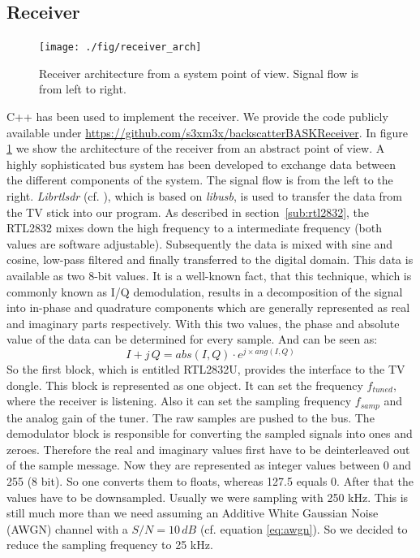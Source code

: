 \documentclass[conference]{IEEEtran}
\begin{document}
\subsection{Receiver}
\begin{figure}[h]
\centering
\texttt{[image: ./fig/receiver\_arch]}
\caption{Receiver architecture from a system point of view. Signal flow is from left to right.}
\label{fig:receiver_arch}
\end{figure}
C++ has been used to implement the receiver. We provide the code publicly available under \url{https://github.com/s3xm3x/backscatterBASKReceiver}. In figure \ref{fig:receiver_arch} we show the architecture of the receiver from an abstract point of view. A highly sophisticated bus system has been developed to exchange data between the different components of the system. The signal flow is from the left to the right. \textit{Librtlsdr} (cf. \cite{steve-m_librtlsdr}), which is based on \textit{libusb}, is used to transfer the data from the TV stick into our program. As described in section~\ref{sub:rtl2832}, the RTL2832 mixes down the high frequency to a intermediate frequency (both values are software adjustable). Subsequently the data is mixed with sine and cosine, low-pass filtered and finally transferred to the digital domain. This data is available as two 8-bit values. It is a well-known fact, that this technique, which is commonly known as I/Q demodulation, results in a decomposition of the signal into in-phase and quadrature components which are generally represented as real and imaginary parts respectively. With this two values, the phase and absolute value of the data can be determined for every sample. And can be seen as:
\begin{equation}
	I+j\,Q = abs(I,Q) \cdot e^{j \times ang(I,Q)} 
\end{equation} 
So the first block, which is entitled RTL2832U, provides the interface to the TV dongle. This block is represented as one object. It can set the frequency \ensuremath{f_{tuned}}, where the receiver is listening. Also it can set the sampling frequency \ensuremath{f_{samp}} and the analog gain of the tuner. The raw samples are pushed to the bus. 
The demodulator block is responsible for converting the sampled signals into ones and zeroes. Therefore the real and imaginary values first have to be deinterleaved out of the sample message. Now they are represented as integer values between 0 and 255 (8 bit). So one converts them to floats, whereas 127.5 equals 0. After that the values have to be downsampled. Usually we were sampling with 250 kHz. This is still much more than we need assuming an Additive White Gaussian Noise (AWGN) channel with a \ensuremath{S/N = 10\,dB} (cf. equation \ref{eq:awgn}). So we decided to reduce the sampling frequency to 25 kHz.
\end{document}
